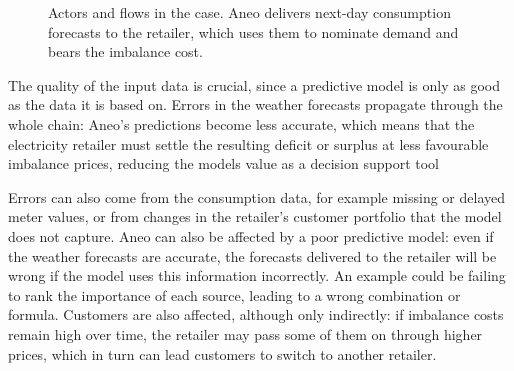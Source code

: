\documentclass[11pt,a4paper]{article}
\begin{document}
\begin{figure}[H]
\caption{Actors and flows in the case. Aneo delivers next-day consumption forecasts to the retailer, which uses them to nominate demand and bears the imbalance cost.}
\label{fig:actors}
\end{figure}

The quality of the input data is crucial, since a predictive model is only as good as the data it is based on. Errors in the weather forecasts propagate through the whole chain: Aneo's predictions become less accurate, which means that the electricity retailer must settle the resulting deficit or surplus at less favourable imbalance prices, reducing the models value as a decision support tool

Errors can also come from the consumption data, for example missing or delayed meter values, or from changes in the retailer's customer portfolio that the model does not capture. Aneo can also be affected by a poor predictive model: even if the weather forecasts are accurate, the forecasts delivered to the retailer will be wrong if the model uses this information incorrectly. An example could be failing to rank the importance of each source, leading to a wrong combination or formula. Customers are also affected, although only indirectly: if imbalance costs remain high over time, the retailer may pass some of them on through higher prices, which in turn can lead customers to switch to another retailer.
\end{document}
